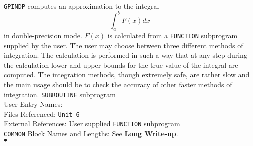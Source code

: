                               
                             
\Submitter{}                                  
                            
{\tt  GPINDP} computes an approximation to the integral
$$ \int^b_a F(x)dx $$
in double-precision mode.
$F(x)$ is calculated from a {\tt FUNCTION} subprogram
supplied by the user. The user may choose between three different
methods of integration. The calculation is performed in such a way
that at any step during the calculation lower and upper bounds
for the true value of the integral are computed. The integration
methods, though extremely safe, are rather slow and the main usage
should be to check the accuracy of other faster methods of integration.
\Structure
{\tt SUBROUTINE} subprogram  \\
User Entry Names: \\
Files Referenced: {\tt Unit 6}\\
External References: User supplied {\tt FUNCTION} subprogram \\
{\tt COMMON} Block Names and Lengths: 
\Usage
See {\bf Long Write-up}.
\\ $\bullet$
